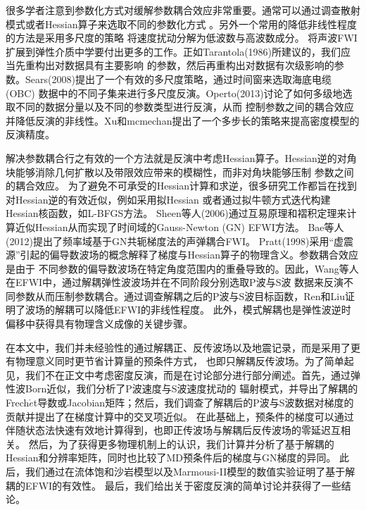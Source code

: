 很多学者注意到参数化方式对缓解参数耦合效应非常重要。通常可以通过调查散射模式或者Hessian算子来选取不同的参数化方式
\cite[]{wu.aki:1985,tarantola:1986,plessix.cao:2011,gholami2013}。另外一个常用的降低非线性程度的方法是采用多尺度的策略
将速度扰动分解为低波数与高波数成分\cite[]{symes.carazzone:1991,bunks1995multiscale,clement:2001,shin.cha:2008,dehoop:2012,
xu:2012,biondi.almomin:2013,ma.hale:2013,warner2016adaptive,alkhalifah2015scattering}。
将声波FWI扩展到弹性介质中学要付出更多的工作。正如Tarantola(1986)\cite{tarantola:1986}所建议的，我们应当先重构出对数据具有主要影响
的参数，然后再重构出对数据有次级影响的参数。Sears(2008)\cite{sears:2008}提出了一个有效的多尺度策略，通过时间窗来选取海底电缆(OBC)
数据中的不同子集来进行多尺度反演。Operto(2013)\cite{operto2013guided}讨论了如何多级地选取不同的数据分量以及不同的参数类型进行反演，从而
控制参数之间的耦合效应并降低反演的非线性。Xu和mcmechan\cite{xu.mcmechan:2014}提出了一个多步长的策略来提高密度模型的反演精度。

解决参数耦合行之有效的一个方法就是反演中考虑Hessian算子。Hessian逆的对角块能够消除几何扩散以及带限效应带来的模糊性，而非对角块能够压制
参数之间的耦合效应\cite[]{pratt1998gauss,fichtner2011hessian,operto2013guided,innanen2014seismic,pan2015estimation}。
为了避免不可承受的Hessian计算和求逆，很多研究工作都旨在找到对Hessian逆的有效近似，例如采用拟Hessian\cite[]{shin2001improved,choi.shin:2008}
或者通过拟牛顿方式迭代构建Hessian核函数，如L-BFGS方法\cite[]{nocedal2006numerical,brossier2009}。
Sheen等人(2006)\cite{sheen:2006}通过互易原理和褶积定理来计算近似Hessian从而实现了时间域的Gauss-Newton (GN) EFWI方法。
Bae等人(2012)\cite{bae:2012}提出了频率域基于GN共轭梯度法的声弹耦合FWI。
Pratt(1998)\cite{pratt1998gauss}采用“虚震源”引起的偏导数波场的概念解释了梯度与Hessian算子的物理含义。参数耦合效应是由于
不同参数的偏导数波场在特定角度范围内的重叠导致的。因此，Wang等人\cite{wang:2015}在EFWI中，通过解耦弹性波波场并在不同阶段分别选取P波与S波
数据来反演不同参数从而压制参数耦合。通过调查解耦之后的P波与S波目标函数，Ren和Liu\cite{ren.liu:2016}证明了波场的解耦可以降低EFWI的非线性程度。
此外，模式解耦也是弹性波逆时偏移中获得具有物理含义成像的关键步骤\cite{yan:2008,wang2016scalar}。

在本文中，我们并未经验性的通过解耦正、反传波场以及地震记录\cite{ren.liu:2016}，而是采用了更有物理意义同时更节省计算量的预条件方式，
也即只解耦反传波场。为了简单起见，我们不在正文中考虑密度反演，而是在讨论部分进行部分阐述。首先，通过弹性波Born近似，我们分析了P波速度与S波速度扰动的
辐射模式，并导出了解耦的Frech{$\acute{e}$}t导数或Jacobian矩阵；然后，我们调查了解耦后的P波与S波数据对梯度的贡献并提出了在梯度计算中的交叉项近似。
在此基础上，预条件的梯度可以通过伴随状态法\cite[]{plessix2006}快速有效地计算得到，也即正传波场与解耦后反传波场的零延迟互相关。
然后，为了获得更多物理机制上的认识，我们计算并分析了基于解耦的Hessian和分辨率矩阵，同时也比较了MD预条件后的梯度与GN梯度的异同。
此后，我们通过在流体饱和沙岩模型以及Marmousi-II模型的数值实验证明了基于解耦的EFWI的有效性。
最后，我们给出关于密度反演的简单讨论并获得了一些结论。

